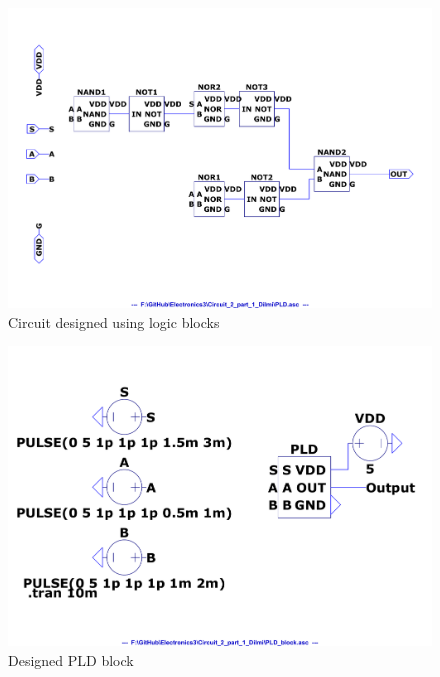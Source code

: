\documentclass[a4paper,11pt]{article}%
\begin{document}
\begin{figure}[H]
	\centering
	\includegraphics[scale=0.4]{figures/2part1/cct.pdf}
	\caption{Circuit designed using logic blocks}
\end{figure}

\begin{figure}[H]
	\centering
	\includegraphics[scale=0.4]{figures/2part1/block.pdf}
	\caption{Designed PLD block}
\end{figure}
\end{document}
